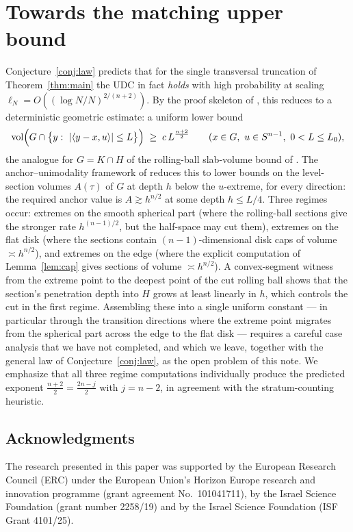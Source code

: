 \documentclass[11pt]{article}
\newcommand{\vol}{\operatorname{vol}}
\begin{document}
\section{Towards the matching upper bound}\label{sec:upper}

Conjecture~\ref{conj:law} predicts that for the single transversal truncation
of Theorem~\ref{thm:main} the UDC in fact \emph{holds} with high probability at
scaling $\ell_N=O((\log N/N)^{2/(n+2)})$.  By the proof skeleton of
\cite{companion2,companion4}, this reduces to a deterministic geometric
estimate: a uniform lower bound
\[
\vol\Bigl(G\cap\bigl\{y:\ |\langle y-x,u\rangle|\le L\bigr\}\Bigr)
\;\ge\;c\,L^{\frac{n+2}2}
\qquad(x\in G,\ u\in S^{n-1},\ 0<L\le L_0),
\]
the analogue for $G=K\cap H$ of the rolling-ball slab-volume bound of
\cite{companion4}.  The anchor--unimodality framework of \cite{companion4}
reduces this to lower bounds on the level-section volumes
$A(\tau)$ of $G$ at depth $h$ below the $u$-extreme, for every direction: the
required anchor value is $A\gtrsim h^{n/2}$ at some depth $h\le L/4$.  Three
regimes occur: extremes on the smooth spherical part (where the rolling-ball
sections give the stronger rate $h^{(n-1)/2}$, but the half-space may cut
them), extremes on the flat disk (where the sections contain
$(n-1)$-dimensional disk caps of volume $\asymp h^{n/2}$), and extremes on the
edge (where the explicit computation of Lemma~\ref{lem:cap} gives sections of
volume $\asymp h^{n/2}$).  A convex-segment witness from the extreme point to
the deepest point of the cut rolling ball shows that the section's penetration
depth into $H$ grows at least linearly in $h$, which controls the cut in the
first regime.  Assembling these into a single uniform constant --- in
particular through the transition directions where the extreme point migrates
from the spherical part across the edge to the flat disk --- requires a
careful case analysis that we have not completed, and which we leave, together
with the general law of Conjecture~\ref{conj:law}, as the open problem of this
note.  We emphasize that all three regime computations individually produce
the predicted exponent $\frac{n+2}2=\frac{2n-j}2$ with $j=n-2$, in agreement
with the stratum-counting heuristic.

\subsection*{Acknowledgments}
The research presented in this paper was supported by the European Research
Council (ERC) under the European Union's Horizon Europe research and
innovation programme (grant agreement No.\ 101041711), by the Israel Science
Foundation (grant number 2258/19) and by the Israel Science Foundation (ISF
Grant 4101/25).
\end{document}
